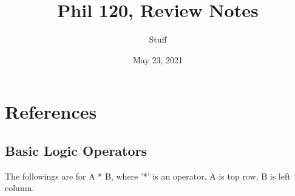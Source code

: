\documentclass{article}
\title{Phil 120, Review Notes}
\author{Stuff}
\date{May 23, 2021}
\begin{document}
\maketitle
\newpage
\tableofcontents{}

\newpage    

\newcommand{\true}{{\mathfrak{t}}}
\newcommand{\false}{{\mathfrak{f}}}
\newcommand{\greencell}{\cellcolor{green!45}T}
\newcommand{\redcell}{\cellcolor{red!45}F}
\newcommand{\orangecell}{\cellcolor{orange!45}B}
\section{References}

\subsection{Basic Logic Operators}
The followings are for A * B, where '*' is an operator, A is top row, B is left column.
\end{document}
